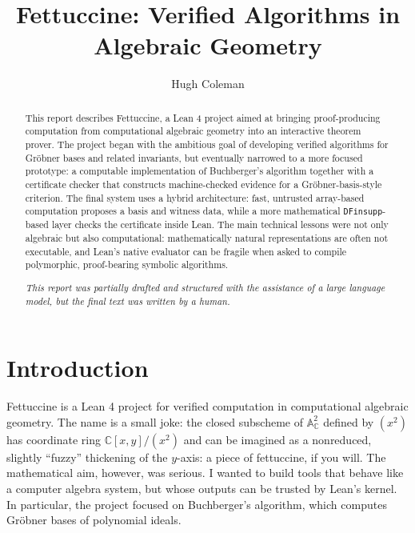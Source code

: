 \documentclass[acmsmall,nonacm,screen]{acmart}
\begin{document}
\title{Fettuccine: Verified Algorithms in Algebraic Geometry}

\author{Hugh Coleman}

\renewcommand{\shortauthors}{Coleman}

\newcommand{\Groebner}{Gr{\"o}bner}

\begin{abstract}
This report describes Fettuccine, a Lean 4 project aimed at bringing proof-producing computation
from computational algebraic geometry into an interactive theorem prover.
The project began with the ambitious goal of developing verified algorithms for \Groebner{} bases
and related invariants, but eventually narrowed to a more focused prototype: a computable
implementation of Buchberger's algorithm together with a certificate checker that constructs
machine-checked evidence for a \Groebner{}-basis-style criterion.
The final system uses a hybrid architecture: fast, untrusted array-based computation proposes a
basis and witness data, while a more mathematical \texttt{DFinsupp}-based layer checks the
certificate inside Lean.
The main technical lessons were not only algebraic but also computational: mathematically natural
representations are often not executable, and Lean's native evaluator can be fragile when asked to
compile polymorphic, proof-bearing symbolic algorithms.

\noindent\it\color{red}
This report was partially drafted and structured with the assistance of a large language model, but the final text was written by a human.
\end{abstract}

\maketitle

\section{Introduction}

Fettuccine is a Lean 4 project for verified computation in computational algebraic geometry.
The name is a small joke: the closed subscheme of $\mathbb{A}^2_{\mathbb{C}}$
defined by $(x^2)$ has coordinate ring $\mathbb{C}[x,y]/(x^2)$ and can be
imagined as a nonreduced, slightly ``fuzzy'' thickening of the $y$-axis: a piece of fettuccine, if you will.
The mathematical aim, however, was serious.
I wanted to build tools that behave like a computer algebra system, but whose outputs can be
trusted by Lean's kernel.
In particular, the project focused on Buchberger's algorithm, which computes \Groebner{} bases of
polynomial ideals.
\end{document}
